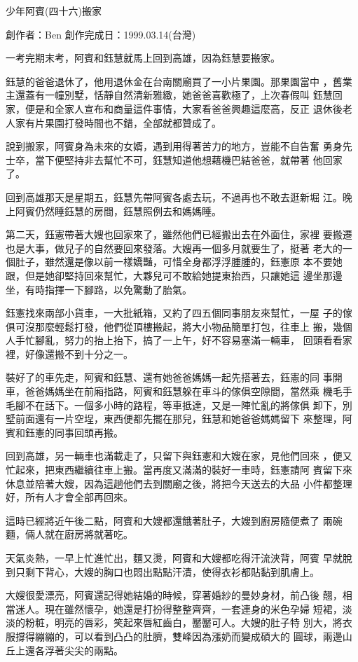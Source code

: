 



少年阿賓(四十六)搬家

創作者：Ben
創作完成日：1999.03.14(台灣)


一考完期末考，阿賓和鈺慧就馬上回到高雄，因為鈺慧要搬家。

鈺慧的爸爸退休了，他用退休金在台南關廟買了一小片果園。那果園當中
，舊業主還蓋有一幢別墅，恬靜自然清新雅緻，她爸爸喜歡極了，上次春假叫
鈺慧回家，便是和全家人宣布和商量這件事情，大家看爸爸興趣這麼高，反正
退休後老人家有片果園打發時間也不錯，全部就都贊成了。

說到搬家，阿賓身為未來的女婿，遇到用得著苦力的地方，豈能不自告奮
勇身先士卒，當下便堅持非去幫忙不可，鈺慧知道他想藉機巴結爸爸，就帶著
他回家了。

回到高雄那天是星期五，鈺慧先帶阿賓各處去玩，不過再也不敢去逛新堀
江。晚上阿賓仍然睡鈺慧的房間，鈺慧照例去和媽媽睡。

第二天，鈺憲帶著大嫂也回家來了，雖然他們已經搬出去在外面住，家裡
要搬遷也是大事，做兒子的自然要回來發落。大嫂再一個多月就要生了，挺著
老大的一個肚子，雖然還是像以前一樣嬌豔，可惜全身都浮浮腫腫的，鈺憲原
本不要她跟，但是她卻堅持回來幫忙，大夥兒可不敢給她提東抬西，只讓她這
邊坐那邊坐，有時指揮一下腳路，以免驚動了胎氣。

鈺憲找來兩部小貨車，一大批紙箱，又約了四五個同事朋友來幫忙，一屋
子的傢俱可沒那麼輕鬆打發，他們從頂樓搬起，將大小物品簡單打包，往車上
搬，幾個人手忙腳亂，努力的抬上抬下，搞了一上午，好不容易塞滿一輛車，
回頭看看家裡，好像還搬不到十分之一。

裝好了的車先走，阿賓和鈺慧、還有她爸爸媽媽一起先搭著去，鈺憲的同
事開車，爸爸媽媽坐在前廂指路，阿賓和鈺慧躲在車斗的傢俱空隙間，當然乘
機毛手毛腳不在話下。一個多小時的路程，等車抵達，又是一陣忙亂的將傢俱
卸下，別墅前面還有一片空埕，東西便都先擺在那兒，鈺慧和她爸爸媽媽留下
來整理，阿賓和鈺憲的同事回頭再搬。

回到高雄，另一輛車也滿載走了，只留下與鈺憲和大嫂在家，見他們回來
，便又忙起來，把東西繼續往車上搬。當再度又滿滿的裝好一車時，鈺憲請阿
賓留下來休息並陪著大嫂，因為這趟他們去到關廟之後，將把今天送去的大品
小件都整理好，所有人才會全部再回來。

這時已經將近午後二點，阿賓和大嫂都還餓著肚子，大嫂到廚房隨便煮了
兩碗麵，倆人就在廚房將就著吃。

天氣炎熱，一早上忙進忙出，麵又燙，阿賓和大嫂都吃得汗流浹背，阿賓
早就脫到只剩下背心，大嫂的胸口也悶出點點汗漬，使得衣衫都貼黏到肌膚上。

大嫂很愛漂亮，阿賓還記得她結婚的時候，穿著婚紗的曼妙身材，前凸後
翹，相當迷人。現在雖然懷孕，她還是打扮得整整齊齊，一套連身的米色孕婦
短裙，淡淡的粉粧，明亮的唇彩，笑起來唇紅齒白，靨靨可人。大嫂的肚子特
別大，將衣服撐得繃繃的，可以看到凸凸的肚臍，雙峰因為漲奶而變成碩大的
圓球，兩邊山丘上還各浮著尖尖的兩點。

